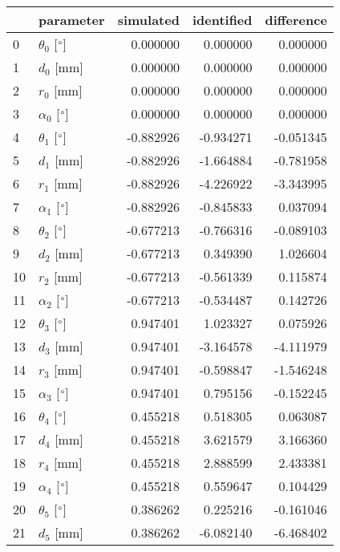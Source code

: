 \documentclass{standalone}%
\begin{document}
%
\normalsize%
\begin{tabular}{llrrr}
\toprule
{} &                 parameter & simulated & identified & difference \\
\midrule
0  &  $\theta_{0}$ [$\degree$] &  0.000000 &   0.000000 &   0.000000 \\
1  &              $d_{0}$ [mm] &  0.000000 &   0.000000 &   0.000000 \\
2  &              $r_{0}$ [mm] &  0.000000 &   0.000000 &   0.000000 \\
3  &  $\alpha_{0}$ [$\degree$] &  0.000000 &   0.000000 &   0.000000 \\
4  &  $\theta_{1}$ [$\degree$] & -0.882926 &  -0.934271 &  -0.051345 \\
5  &              $d_{1}$ [mm] & -0.882926 &  -1.664884 &  -0.781958 \\
6  &              $r_{1}$ [mm] & -0.882926 &  -4.226922 &  -3.343995 \\
7  &  $\alpha_{1}$ [$\degree$] & -0.882926 &  -0.845833 &   0.037094 \\
8  &  $\theta_{2}$ [$\degree$] & -0.677213 &  -0.766316 &  -0.089103 \\
9  &              $d_{2}$ [mm] & -0.677213 &   0.349390 &   1.026604 \\
10 &              $r_{2}$ [mm] & -0.677213 &  -0.561339 &   0.115874 \\
11 &  $\alpha_{2}$ [$\degree$] & -0.677213 &  -0.534487 &   0.142726 \\
12 &  $\theta_{3}$ [$\degree$] &  0.947401 &   1.023327 &   0.075926 \\
13 &              $d_{3}$ [mm] &  0.947401 &  -3.164578 &  -4.111979 \\
14 &              $r_{3}$ [mm] &  0.947401 &  -0.598847 &  -1.546248 \\
15 &  $\alpha_{3}$ [$\degree$] &  0.947401 &   0.795156 &  -0.152245 \\
16 &  $\theta_{4}$ [$\degree$] &  0.455218 &   0.518305 &   0.063087 \\
17 &              $d_{4}$ [mm] &  0.455218 &   3.621579 &   3.166360 \\
18 &              $r_{4}$ [mm] &  0.455218 &   2.888599 &   2.433381 \\
19 &  $\alpha_{4}$ [$\degree$] &  0.455218 &   0.559647 &   0.104429 \\
20 &  $\theta_{5}$ [$\degree$] &  0.386262 &   0.225216 &  -0.161046 \\
21 &              $d_{5}$ [mm] &  0.386262 &  -6.082140 &  -6.468402 \\

\end{tabular}
\end{document}
